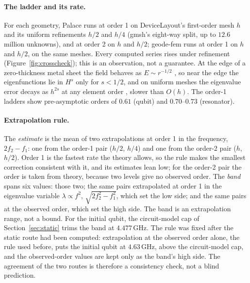 \documentclass{anvil-paper}
\begin{document}
\paragraph{The ladder and its rate.}
For each geometry, Palace runs at order 1 on DeviceLayout's first-order
mesh $h$ and its uniform refinements $h/2$ and $h/4$ (gmsh's eight-way
split, up to $12.6$ million unknowns), and at order 2 on $h$ and $h/2$;
geode-fem runs at order 1 on $h$ and $h/2$, on the same meshes. Every
computed series rises under refinement (Figure~\ref{fig:crosscheck}); this
is an observation, not a guarantee. At the edge of a zero-thickness metal
sheet the field behaves as $E \sim r^{-1/2}$ \citep{meixner1972behavior},
so near the edge the eigenfunctions lie in $H^{s}$ only for $s < 1/2$, and
on uniform meshes the eigenvalue error decays as $h^{2s}$ at any element
order \citep{boffi2010finite}, slower than $O(h)$. The order-1
ladders show pre-asymptotic orders of $0.61$ (qubit) and $0.70$--$0.73$
(resonator).

\paragraph{Extrapolation rule.}
The \emph{estimate} is the mean of two extrapolations at order 1 in the
frequency, $2f_2 - f_1$: one from the order-1 pair ($h/2$, $h/4$) and one
from the order-2 pair ($h$, $h/2$). Order 1 is the fastest rate the
theory allows, so the rule makes the smallest correction consistent with
it, and its estimates lean low; for the order-2 pair the order is taken
from theory, because two levels give no observed order. The \emph{band}
spans six values: those two; the same pairs extrapolated at order 1 in the
eigenvalue variable $\lambda\propto f^2$, $\sqrt{2f_2^2 - f_1^2}$, which
set the low side; and the same pairs at the observed order, which set the
high side. The band is an extrapolation range, not a bound. For the
initial qubit, the circuit-model cap of Section~\ref{sec:static} trims the
band at $4.477$\,GHz. The rule was fixed after the static route had been
computed: extrapolation at the observed order alone, the rule used before,
puts the initial qubit at $4.63$\,GHz, above the circuit-model cap, and the
observed-order values are kept only as the band's high side. The agreement
of the two routes is therefore a consistency check, not a blind
prediction.
\end{document}
